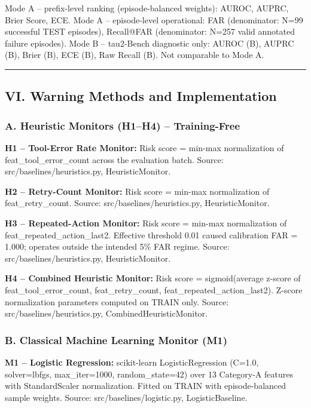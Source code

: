 \documentclass[
]{article}
\begin{document}
Mode A -- prefix-level ranking (episode-balanced weights): AUROC, AUPRC,
Brier Score, ECE. Mode A -- episode-level operational: FAR (denominator:
N=99 successful TEST episodes), Recall@FAR (denominator: N=257 valid
annotated failure episodes). Mode B -- tau2-Bench diagnostic only: AUROC
(B), AUPRC (B), Brier (B), ECE (B), Raw Recall (B). Not comparable to
Mode A.

\begin{center}\rule{0.5\linewidth}{0.5pt}\end{center}

\subsection{VI. Warning Methods and
Implementation}\label{vi.-warning-methods-and-implementation}

\subsubsection{A. Heuristic Monitors (H1--H4) --
Training-Free}\label{a.-heuristic-monitors-h1h4-training-free}

\textbf{H1 -- Tool-Error Rate Monitor:} Risk score = min-max
normalization of feat\_tool\_error\_count across the evaluation batch.
Source: src/baselines/heuristics.py, HeuristicMonitor.

\textbf{H2 -- Retry-Count Monitor:} Risk score = min-max normalization
of feat\_retry\_count. Source: src/baselines/heuristics.py,
HeuristicMonitor.

\textbf{H3 -- Repeated-Action Monitor:} Risk score = min-max
normalization of feat\_repeated\_action\_last2. Effective threshold 0.01
caused calibration FAR = 1.000; operates outside the intended 5\% FAR
regime. Source: src/baselines/heuristics.py, HeuristicMonitor.

\textbf{H4 -- Combined Heuristic Monitor:} Risk score = sigmoid(average
z-score of feat\_tool\_error\_count, feat\_retry\_count,
feat\_repeated\_action\_last2). Z-score normalization parameters
computed on TRAIN only. Source: src/baselines/heuristics.py,
CombinedHeuristicMonitor.

\subsubsection{B. Classical Machine Learning Monitor
(M1)}\label{b.-classical-machine-learning-monitor-m1}

\textbf{M1 -- Logistic Regression:} scikit-learn LogisticRegression
(C=1.0, solver=lbfgs, max\_iter=1000, random\_state=42) over 13
Category-A features with StandardScaler normalization. Fitted on TRAIN
with episode-balanced sample weights. Source: src/baselines/logistic.py,
LogisticBaseline.
\end{document}
